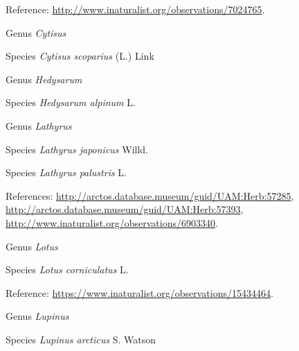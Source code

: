 \documentclass[9pt, article]{memoir}
\begin{document}
\begin{multicols}{2}
\vspace{6pt}Reference: 
\url{http://www.inaturalist.org/observations/7024765}.

\vspace{6pt}\noindent\hspace{30pt}Genus \textit{Cytisus}


\vspace{6pt}\noindent\hspace{36pt}Species \textit{Cytisus scoparius} (L.) Link


\vspace{6pt}\noindent\hspace{30pt}Genus \textit{Hedysarum}


\vspace{6pt}\noindent\hspace{36pt}Species \textit{Hedysarum alpinum} L.


\vspace{6pt}\noindent\hspace{30pt}Genus \textit{Lathyrus}


\vspace{6pt}\noindent\hspace{36pt}Species \textit{Lathyrus japonicus} Willd.


\vspace{6pt}\noindent\hspace{36pt}Species \textit{Lathyrus palustris} L.


\vspace{6pt}References: 
\url{http://arctos.database.museum/guid/UAM:Herb:57285}, 
\url{http://arctos.database.museum/guid/UAM:Herb:57393}, 
\url{http://www.inaturalist.org/observations/6903340}.

\vspace{6pt}\noindent\hspace{30pt}Genus \textit{Lotus}


\vspace{6pt}\noindent\hspace{36pt}Species \textit{Lotus corniculatus} L.


\vspace{6pt}Reference: 
\url{https://www.inaturalist.org/observations/15434464}.

\vspace{6pt}\noindent\hspace{30pt}Genus \textit{Lupinus}


\vspace{6pt}\noindent\hspace{36pt}Species \textit{Lupinus arcticus} S. Watson



\end{multicols}
\end{document}
